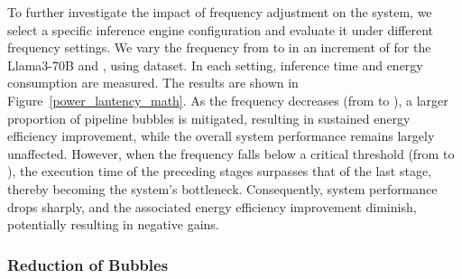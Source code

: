 To further investigate the impact of frequency adjustment on the system, we select a specific inference engine configuration and evaluate it under different frequency settings.
We vary the frequency from  to  in an increment of  for the Llama3-70B and , using  dataset.
In each setting, inference time and energy consumption are measured.
The results are shown in Figure~\ref{power_lantency_math}.
As the frequency decreases (from  to ), a larger proportion of pipeline bubbles is mitigated, resulting in sustained energy efficiency improvement, while the overall system performance remains largely unaffected.
However, when the frequency falls below a critical threshold (from  to ), the execution time of the preceding stages surpasses that of the last stage, thereby becoming the system's bottleneck.
Consequently, system performance drops sharply, and the associated energy efficiency improvement diminish, potentially resulting in negative gains.


\subsubsection{Reduction of Bubbles}
\label{sec:evaluatebubble}



